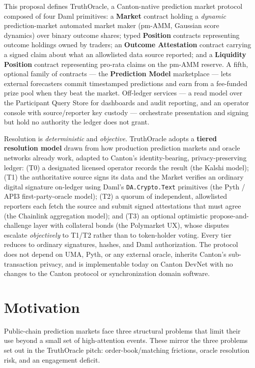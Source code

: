 \documentclass[11pt,a4paper]{article}
\begin{document}
This proposal defines TruthOracle, a Canton-native prediction market protocol composed of four Daml primitives: a \textbf{Market} contract holding a \emph{dynamic} prediction-market automated market maker (pm-AMM, Gaussian score dynamics) over binary outcome shares; typed \textbf{Position} contracts representing outcome holdings owned by traders; an \textbf{Outcome Attestation} contract carrying a signed claim about what an allowlisted data source reported; and a \textbf{Liquidity Position} contract representing pro-rata claims on the pm-AMM reserve. A fifth, optional family of contracts --- the \textbf{Prediction Model} marketplace --- lets external forecasters commit timestamped predictions and earn from a fee-funded prize pool when they beat the market. Off-ledger services --- a read model over the Participant Query Store for dashboards and audit reporting, and an operator console with source/reporter key custody --- orchestrate presentation and signing but hold no authority the ledger does not grant.

Resolution is \emph{deterministic} and \emph{objective}. TruthOracle adopts a \textbf{tiered resolution model} drawn from how production prediction markets and oracle networks already work, adapted to Canton's identity-bearing, privacy-preserving ledger: (T0) a designated licensed operator records the result (the Kalshi model); (T1) the authoritative source signs its data and the Market verifies an ordinary digital signature on-ledger using Daml's \texttt{DA.Crypto.Text} primitives (the Pyth / API3 first-party-oracle model); (T2) a quorum of independent, allowlisted reporters each fetch the source and submit signed attestations that must agree (the Chainlink aggregation model); and (T3) an optional optimistic propose-and-challenge layer with collateral bonds (the Polymarket UX), whose disputes escalate \emph{objectively} to T1/T2 rather than to token-holder voting. Every tier reduces to ordinary signatures, hashes, and Daml authorization. The protocol does not depend on UMA, Pyth, or any external oracle, inherits Canton's sub-transaction privacy, and is implementable today on Canton DevNet with no changes to the Canton protocol or synchronization domain software.

\section{Motivation}

Public-chain prediction markets face three structural problems that limit their use beyond a small set of high-attention events. These mirror the three problems set out in the TruthOracle pitch: order-book/matching frictions, oracle resolution risk, and an engagement deficit.
\end{document}
